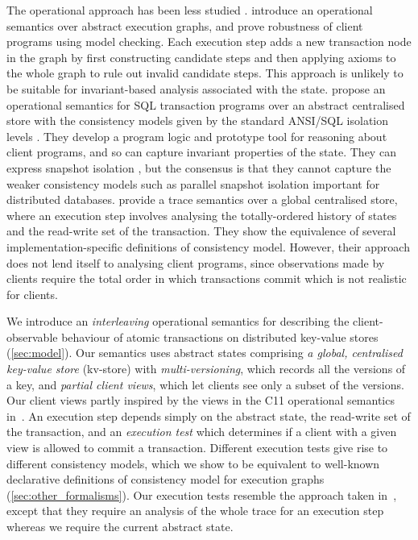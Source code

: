 The operational approach has been less studied \cite{sureshConcur,alonetogether,seebelieve}.
\citet{sureshConcur} introduce an operational semantics over abstract
execution graphs, and prove robustness of client programs using model
checking. Each execution step adds a new transaction node in the graph
by first constructing candidate steps and then applying axioms to the
whole graph to rule out invalid candidate steps.  This approach is
unlikely to be suitable for invariant-based analysis associated with
the state.  \citet{alonetogether} propose an operational semantics for
SQL transaction programs over an abstract centralised store with the consistency
models given by the standard ANSI/SQL isolation levels \cite{si}. They
develop a program logic and prototype tool for reasoning about client
programs, and so can capture invariant properties of the state. They can
express snapshot isolation \cite{si}, but the consensus is
that they cannot
capture the weaker consistency models such as parallel snapshot isolation \cite{PSI} 
important for distributed databases. 
\citet{seebelieve} provide a trace semantics
over a global centralised store, where an execution step involves
analysing the totally-ordered
history of states and the read-write set of the transaction.
They show the equivalence of several
implementation-specific definitions of consistency model. However, their
approach does not lend itself to  analysing client programs,
since observations made by clients require the total order in
which transactions commit which is not realistic for clients. 



We introduce an \emph{interleaving} operational semantics for
describing the client-observable behaviour of atomic transactions on
distributed key-value stores (\cref{sec:model}). Our semantics uses abstract states
comprising \emph{a global, centralised key-value store} (kv-store) with
\emph{multi-versioning}, which records all the versions of a key, and
\emph{partial client views}, which let clients see only a subset of the
versions.  Our client views partly inspired by the views in the C11
operational semantics in~\cite{promises}.  An execution step depends
simply on the abstract state, the read-write set of the transaction, and an \emph{execution test} which
determines if a client with a given view is allowed to commit a
transaction. Different execution tests give rise to different consistency models, %
which we show to be equivalent to well-known
declarative definitions of consistency model for execution graphs (\cref{sec:other_formalisms}).
Our execution tests resemble the  approach taken in~\cite{seebelieve},
except that they require an analysis of the whole trace for an
execution step whereas we require the current abstract state. 





